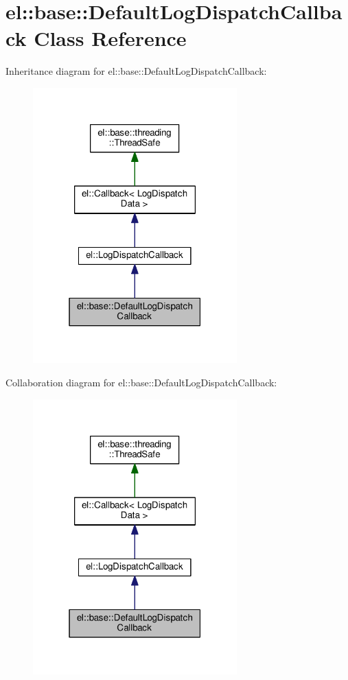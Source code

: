 \hypertarget{classel_1_1base_1_1_default_log_dispatch_callback}{}\section{el\+:\+:base\+:\+:Default\+Log\+Dispatch\+Callback Class Reference}
\label{classel_1_1base_1_1_default_log_dispatch_callback}


Inheritance diagram for el\+:\+:base\+:\+:Default\+Log\+Dispatch\+Callback\+:
\nopagebreak
\begin{figure}[H]
\begin{center}
\leavevmode
\includegraphics[width=223pt]{classel_1_1base_1_1_default_log_dispatch_callback__inherit__graph}
\end{center}
\end{figure}


Collaboration diagram for el\+:\+:base\+:\+:Default\+Log\+Dispatch\+Callback\+:
\nopagebreak
\begin{figure}[H]
\begin{center}
\leavevmode
\includegraphics[width=223pt]{classel_1_1base_1_1_default_log_dispatch_callback__coll__graph}
\end{center}
\end{figure}
